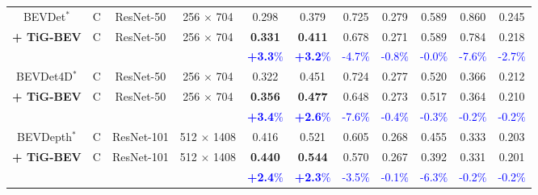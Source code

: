 \begin{table*}[ht]
{\begin{tabular}{c|c|c|c|cc|ccccc}
BEVDet$^*$ \cite{b19} & C &ResNet-50   & 256 $\times$ 704 & 0.298& 0.379 & 0.725 & 0.279 & 0.589 & 0.860 & 0.245  \\ 
\rowcolor{gray!12} \textbf{+ TiG-BEV}     &C  &ResNet-50  & 256 $\times$ 704 & \textbf{0.331} & \textbf{0.411}& 0.678 & 0.271 & 0.589 & 0.784 & 0.218  \\ 
\rowcolor{gray!12}& &&& \textbf{\textcolor{blue}{+3.3$\%$} }& \textbf{\textcolor{blue}{+3.2$\%$}}&\textcolor{blue}{-4.7$\%$} & \textcolor{blue}{-0.8$\%$} & \textcolor{blue}{-0.0$\%$} & \textcolor{blue}{-7.6$\%$} & \textcolor{blue}{-2.7$\%$}   \\ 
\midrule
BEVDet4D$^*$ \cite{b23} & C &ResNet-50   & 256 $\times$ 704 & 0.322 & 0.451& 0.724& 0.277& 0.520 &0.366 &0.212  \\
\rowcolor{gray!12} \textbf{+ TiG-BEV}     & C &ResNet-50  & 256 $\times$ 704 & \textbf{0.356}& \textbf{0.477} & 0.648 & 0.273 & 0.517 & 0.364 & 0.210  \\ 
\rowcolor{gray!12}& &&& \textbf{\textcolor{blue}{+3.4$\%$} }& \textbf{\textcolor{blue}{+2.6$\%$}}&\textcolor{blue}{-7.6$\%$} & \textcolor{blue}{-0.4$\%$} & \textcolor{blue}{-0.3$\%$} & \textcolor{blue}{-0.2$\%$} & \textcolor{blue}{-0.2$\%$}   \\ 
\midrule
BEVDepth$^*$ \cite{b7} & C &ResNet-101   & 512 $\times$ 1408 & 0.416 & 0.521& 0.605 & 0.268 & 0.455 & 0.333 & 0.203  \\
\rowcolor{gray!12}   \textbf{+ TiG-BEV}   & C & ResNet-101  & 512 $\times$ 1408  & \textbf{0.440}& \textbf{0.544} & 0.570 & 0.267 & 0.392 & 0.331 & 0.201  \\ 
\rowcolor{gray!12}& &&& \textbf{\textcolor{blue}{+2.4$\%$} }& \textbf{\textcolor{blue}{+2.3$\%$}}&\textcolor{blue}{-3.5$\%$} & \textcolor{blue}{-0.1$\%$} & \textcolor{blue}{-6.3$\%$} & \textcolor{blue}{-0.2$\%$} & \textcolor{blue}{-0.2$\%$}   \\ 
\bottomrule[1.2pt]
\end{tabular}
}

\label{tab:nus_val_sota}
\end{table*}